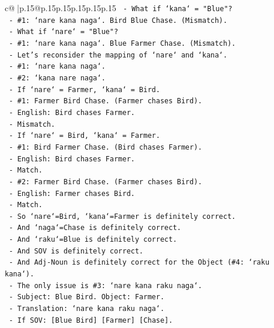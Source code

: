 \documentclass{article}
\begin{document}
{\begin{supertabular}{c@{$\;$}|p{.15\linewidth}@{}p{.15\linewidth}p{.15\linewidth}p{.15\linewidth}p{.15\linewidth}p{.15\linewidth}}
{{{\texttt{      {-} What if `kana` = "Blue"?} \\
\texttt{        {-} \#1: `nare kana naga`. Bird Blue Chase. (Mismatch).} \\
\texttt{      {-} What if `nare` = "Blue"?} \\
\texttt{        {-} \#1: `nare kana naga`. Blue Farmer Chase. (Mismatch).} \\
\texttt{    {-} Let's reconsider the mapping of `nare` and `kana`.} \\
\texttt{      {-} \#1: `nare kana naga`.} \\
\texttt{      {-} \#2: `kana nare naga`.} \\
\texttt{      {-} If `nare` = Farmer, `kana` = Bird.} \\
\texttt{        {-} \#1: Farmer Bird Chase. (Farmer chases Bird).} \\
\texttt{          {-} English: Bird chases Farmer.} \\
\texttt{          {-} Mismatch.} \\
\texttt{      {-} If `nare` = Bird, `kana` = Farmer.} \\
\texttt{        {-} \#1: Bird Farmer Chase. (Bird chases Farmer).} \\
\texttt{          {-} English: Bird chases Farmer.} \\
\texttt{          {-} Match.} \\
\texttt{        {-} \#2: Farmer Bird Chase. (Farmer chases Bird).} \\
\texttt{          {-} English: Farmer chases Bird.} \\
\texttt{          {-} Match.} \\
\texttt{      {-} So `nare`=Bird, `kana`=Farmer is definitely correct.} \\
\texttt{      {-} And `naga`=Chase is definitely correct.} \\
\texttt{      {-} And `raku`=Blue is definitely correct.} \\
\texttt{      {-} And SOV is definitely correct.} \\
\texttt{      {-} And Adj{-}Noun is definitely correct for the Object (\#4: `raku kana`).} \\
\texttt{      {-} The only issue is \#3: `nare kana raku naga`.} \\
\texttt{        {-} Subject: Blue Bird. Object: Farmer.} \\
\texttt{        {-} Translation: `nare kana raku naga`.} \\
\texttt{        {-} If SOV: {[}Blue Bird{]} {[}Farmer{]} {[}Chase{]}.} \\
}}}
\end{supertabular}}
\end{document}
